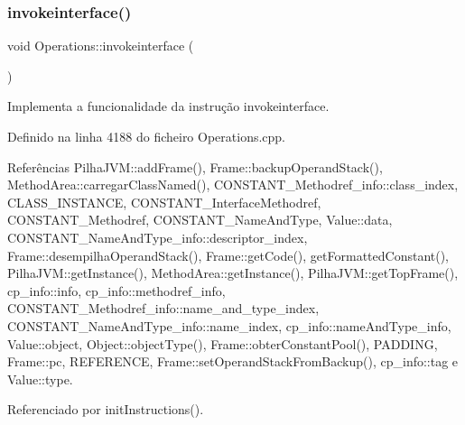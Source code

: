 \subsubsection{\texorpdfstring{invokeinterface()}{invokeinterface()}}
{\footnotesize\ttfamily void Operations\+::invokeinterface (\begin{DoxyParamCaption}{ }\end{DoxyParamCaption})\hspace{0.3cm}{\ttfamily [private]}}



Implementa a funcionalidade da instrução invokeinterface. 



Definido na linha 4188 do ficheiro Operations.\+cpp.



Referências Pilha\+J\+V\+M\+::add\+Frame(), Frame\+::backup\+Operand\+Stack(), Method\+Area\+::carregar\+Class\+Named(), C\+O\+N\+S\+T\+A\+N\+T\+\_\+\+Methodref\+\_\+info\+::class\+\_\+index, C\+L\+A\+S\+S\+\_\+\+I\+N\+S\+T\+A\+N\+CE, C\+O\+N\+S\+T\+A\+N\+T\+\_\+\+Interface\+Methodref, C\+O\+N\+S\+T\+A\+N\+T\+\_\+\+Methodref, C\+O\+N\+S\+T\+A\+N\+T\+\_\+\+Name\+And\+Type, Value\+::data, C\+O\+N\+S\+T\+A\+N\+T\+\_\+\+Name\+And\+Type\+\_\+info\+::descriptor\+\_\+index, Frame\+::desempilha\+Operand\+Stack(), Frame\+::get\+Code(), get\+Formatted\+Constant(), Pilha\+J\+V\+M\+::get\+Instance(), Method\+Area\+::get\+Instance(), Pilha\+J\+V\+M\+::get\+Top\+Frame(), cp\+\_\+info\+::info, cp\+\_\+info\+::methodref\+\_\+info, C\+O\+N\+S\+T\+A\+N\+T\+\_\+\+Methodref\+\_\+info\+::name\+\_\+and\+\_\+type\+\_\+index, C\+O\+N\+S\+T\+A\+N\+T\+\_\+\+Name\+And\+Type\+\_\+info\+::name\+\_\+index, cp\+\_\+info\+::name\+And\+Type\+\_\+info, Value\+::object, Object\+::object\+Type(), Frame\+::obter\+Constant\+Pool(), P\+A\+D\+D\+I\+NG, Frame\+::pc, R\+E\+F\+E\+R\+E\+N\+CE, Frame\+::set\+Operand\+Stack\+From\+Backup(), cp\+\_\+info\+::tag e Value\+::type.



Referenciado por init\+Instructions().

